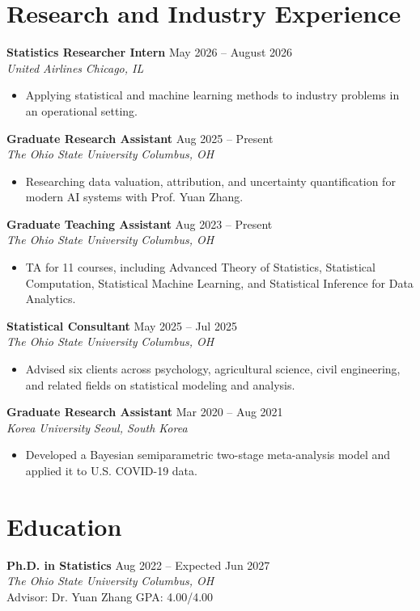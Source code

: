 \documentclass[letterpaper,10pt]{article}
\newcommand{\roleline}[4]{%
  \textbf{#1} \hfill {\color{muted}#2}\\
  \textit{#3} \hfill \textit{#4}\vspace{2pt}
}
\newcommand{\eduline}[4]{%
  \textbf{#1} \hfill {\color{muted}#2}\\
  \textit{#3} \hfill \textit{#4}\\[-1pt]
}
\newcommand{\detailline}[1]{%
  {\small\color{muted}#1}\vspace{2pt}
}
\begin{document}
\newpage
\section{Research and Industry Experience}
\roleline{Statistics Researcher Intern}{May 2026 -- August 2026}{United Airlines}{Chicago, IL}
\begin{itemize}
  \item Applying statistical and machine learning methods to industry problems in an operational setting.
\end{itemize}

\roleline{Graduate Research Assistant}{Aug 2025 -- Present}{The Ohio State University}{Columbus, OH}
\begin{itemize}
  \item Researching data valuation, attribution, and uncertainty quantification for modern AI systems with Prof. Yuan Zhang.
\end{itemize}

\roleline{Graduate Teaching Assistant}{Aug 2023 -- Present}{The Ohio State University}{Columbus, OH}
\begin{itemize}
  \item TA for 11 courses, including Advanced Theory of Statistics, Statistical Computation, Statistical Machine Learning, and Statistical Inference for Data Analytics.
\end{itemize}

\roleline{Statistical Consultant}{May 2025 -- Jul 2025}{The Ohio State University}{Columbus, OH}
\begin{itemize}
  \item Advised six clients across psychology, agricultural science, civil engineering, and related fields on statistical modeling and analysis.
\end{itemize}

\roleline{Graduate Research Assistant}{Mar 2020 -- Aug 2021}{Korea University}{Seoul, South Korea}
\begin{itemize}
  \item Developed a Bayesian semiparametric two-stage meta-analysis model and applied it to U.S. COVID-19 data.
\end{itemize}

\section{Education}
\eduline{Ph.D. in Statistics}{Aug 2022 -- Expected Jun 2027}{The Ohio State University}{Columbus, OH}
\detailline{Advisor: Dr. Yuan Zhang \quad GPA: 4.00/4.00}
\end{document}
